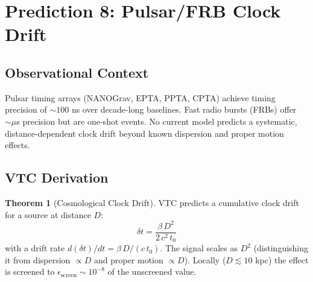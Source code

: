 \documentclass[11pt,a4paper]{article}
\theoremstyle{definition}
\newtheorem{theorem}{Theorem}[section]
\begin{document}
\section{Prediction 8: Pulsar/FRB Clock Drift}
\label{sec:p8}

\subsection{Observational Context}

Pulsar timing arrays (NANOGrav, EPTA, PPTA, CPTA) achieve timing precision of $\sim 100$ ns over decade-long baselines. Fast radio bursts (FRBs) offer $\sim\mu$s precision but are one-shot events. No current model predicts a systematic, distance-dependent clock drift beyond known dispersion and proper motion effects.

\subsection{VTC Derivation}

\begin{theorem}[Cosmological Clock Drift]
\label{thm:p8}
VTC predicts a cumulative clock drift for a source at distance $D$:
\begin{equation}
\delta t = \frac{\beta\,D^2}{2\,c^2\,t_0}
\end{equation}
with a drift rate $d(\delta t)/dt = \beta\,D/(c\,t_0)$. The signal scales as $D^2$ (distinguishing it from dispersion $\propto D$ and proper motion $\propto D$). Locally ($D \lesssim 10$ kpc) the effect is screened to $\epsilon_\mathrm{screen} \sim 10^{-8}$ of the unscreened value.
\end{theorem}
\end{document}
